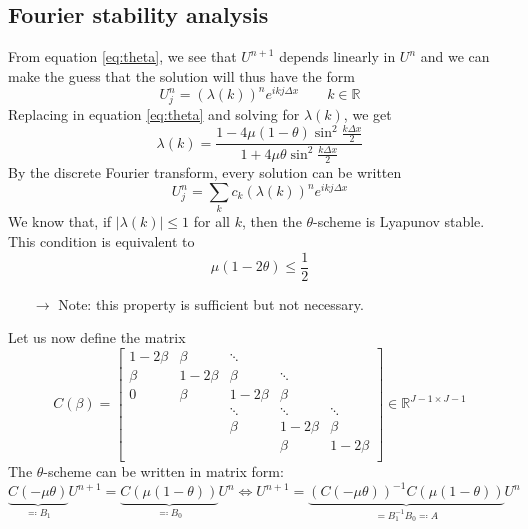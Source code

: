 \documentclass[12pt, openany]{report}
\newcommand{\R}{\mathbb{R}}
\theoremstyle{definition}
\begin{document}
\subsection{Fourier stability analysis}
From equation \eqref{eq:theta}, we see that $U^{n+1}$ depends linearly in $U^n$ and we can make the guess that the solution will thus have the form 
\begin{equation}
	U_j^n = (\lambda(k))^n e^{ikj\Delta x} \qquad k\in \R
\end{equation}
Replacing in equation \eqref{eq:theta} and solving for $\lambda(k)$, we get
\begin{equation}
	\lambda(k) = \frac{1-4\mu(1-\theta)\sin^2\frac{k\Delta x}{2}}{1+4\mu \theta \sin^2 \frac{k\Delta x}{2}}
\end{equation}
By the discrete Fourier transform, every solution can be written 
\begin{equation}
	U_j^n = \sum_k c_k (\lambda(k))^n e^{ikj\Delta x}
\end{equation}
We know that, if $|\lambda(k)| \le 1$ for all $k$, then the $\theta$-scheme is Lyapunov stable. This condition is equivalent to 
\begin{equation}
	\mu(1-2\theta) \le \frac{1}{2}
\end{equation}
\begin{itemize}
	\item [$\to$] Note: this property is sufficient but not necessary. 
\end{itemize}
Let us now define the matrix 
\begin{equation}
	C(\beta) = \begin{bmatrix}
		1-2\beta & \beta & \ddots\\
		\beta & 1-2\beta & \beta & \ddots \\
		0 & \beta & 1-2\beta & \beta \\
		& & \ddots & \ddots & \ddots \\
		& & \beta & 1-2\beta & \beta \\
		& & & \beta & 1-2\beta \\ 
	\end{bmatrix} \in \R^{J-1 \times J-1}
\end{equation}
The $\theta$-scheme can be written in matrix form:
\begin{equation}
	\underbrace{C(-\mu \theta)}_{\eqqcolon B_1}U^{n+1} = \underbrace{C(\mu(1-\theta))}_{\eqqcolon B_0} U^n \Longleftrightarrow U^{n+1} = \underbrace{(C(-\mu\theta))^{-1} C(\mu(1-\theta))}_{=B_1^{-1}B_0 \eqqcolon A} U^n
\end{equation}
\end{document}

